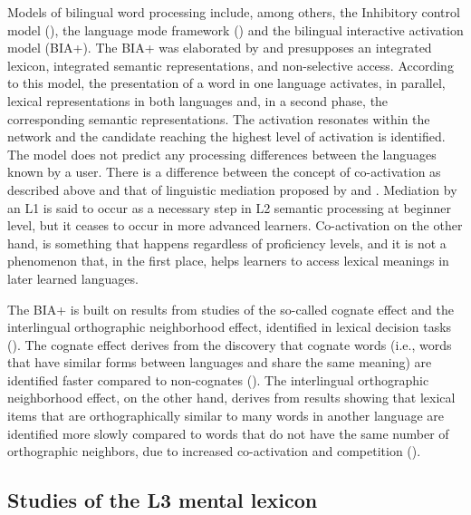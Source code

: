 \documentclass[output=paper,colorlinks,citecolor=brown,nonflat]{langsci/langscibook}
\begin{document}
Models of bilingual word processing include, among others, the Inhibitory control model (\citealt{Green1986, Green1998}), the language mode framework (\citealt{Grosjean1997, Grosjean2001}) and the bilingual interactive activation model (BIA+). The BIA+ was elaborated by \citet{DijkstraVanHeuven2002} and presupposes an integrated lexicon, integrated semantic representations, and non-selective access. According to this model, the presentation of a word in one language activates, in parallel, lexical representations in both languages and, in a second phase, the corresponding semantic representations. The activation resonates within the network and the candidate reaching the highest level of activation is identified. The model does not predict any processing differences between the languages known by a user. There is a difference between the concept of co-activation as described above and that of linguistic mediation proposed by \citet{KrollStewart1994} and \citet{FitzpatrickIzura2011}. Mediation by an L1 is said to occur as a necessary step in L2 semantic processing at beginner level, but it ceases to occur in more advanced learners. Co-activation on the other hand, is something that happens regardless of proficiency levels, and it is not a phenomenon that, in the first place, helps learners to access lexical meanings in later learned languages.

The BIA+ is built on results from studies of the so-called cognate effect and the interlingual orthographic neighborhood effect, identified in lexical decision tasks (\citealt{SánchezCasasEtAl1992, LemhöferDijkstra2004, Dijkstra2005}). The cognate effect derives from the discovery that cognate words (i.e., words that have similar forms between languages and share the same meaning) are identified faster compared to non-cognates (\citealt{LemhöferDijkstra2004}). The interlingual orthographic neighborhood effect, on the other hand, derives from results showing that lexical items that are orthographically similar to many words in another language are identified more slowly compared to words that do not have the same number of orthographic neighbors, due to increased co-activation and competition (\citealt{GraingerDijkstra1992, VanHeuvenEtAl1998}).

\subsection{Studies of the L3 mental lexicon}\label{sec:gudmundson:1.2}
\end{document}
